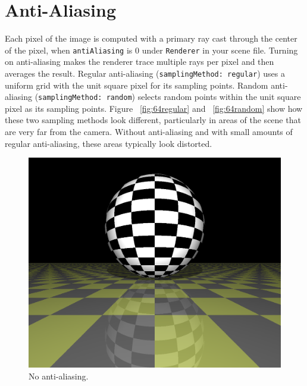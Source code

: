 \documentclass{article}
\begin{document}
\section{Anti-Aliasing}

Each pixel of the image is computed with a primary ray cast through the center of the pixel, when \texttt{antiAliasing} is 0 under \texttt{Renderer} in your scene file.
Turning on anti-aliasing makes the renderer trace multiple rays per pixel and then averages the result.
Regular anti-aliasing (\texttt{samplingMethod: regular}) uses a uniform grid with the unit square pixel for its sampling points.
Random anti-aliasing (\texttt{samplingMethod: random}) selects random points within the unit square pixel as its sampling points.
Figure ~\ref{fig:64regular} and ~\ref{fig:64random} show how these two sampling methods look different, particularly in areas of the scene that are very far from the camera.
Without anti-aliasing and with small amounts of regular anti-aliasing, these areas typically look distorted.

\begin{figure}[H]
    \includegraphics[width=\textwidth]{./examples/AntiAliasingComparison/Scene_noAntiAliasing.png}
    \caption{No anti-aliasing.}
\end{figure}
\end{document}
